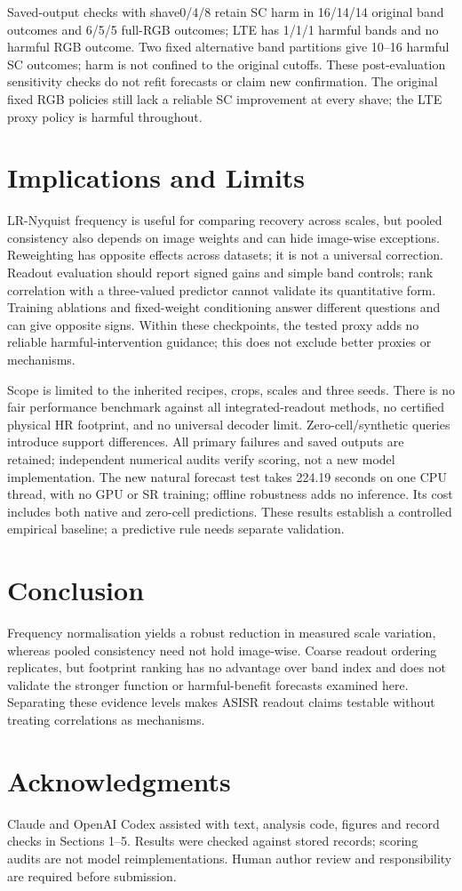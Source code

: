 Saved-output checks with shave0/4/8 retain SC harm in 16/14/14 original
band outcomes and 6/5/5 full-RGB outcomes; LTE has 1/1/1 harmful bands
and no harmful RGB outcome. Two fixed alternative band partitions give
10--16 harmful SC outcomes; harm is not confined to the original cutoffs.
These post-evaluation sensitivity checks do not refit forecasts or claim
new confirmation. The original fixed RGB policies still lack a reliable
SC improvement at every shave; the LTE proxy policy is harmful throughout.

\section{Implications and Limits}
LR-Nyquist frequency is useful for comparing recovery across scales,
but pooled consistency also depends on image weights and can hide
image-wise exceptions. Reweighting has opposite effects across datasets;
it is not a universal correction. Readout evaluation should report signed gains and
simple band controls; rank correlation with a three-valued predictor
cannot validate its quantitative form. Training ablations and
fixed-weight conditioning answer different questions and can give
opposite signs. Within these checkpoints, the tested proxy adds no
reliable harmful-intervention guidance; this does not exclude better
proxies or mechanisms.

\newpage
Scope is limited to the inherited recipes, crops, scales and three seeds.
There is no fair performance benchmark against all integrated-readout
methods, no certified physical HR footprint, and no universal decoder
limit. Zero-cell/synthetic queries introduce support differences. All
primary failures and saved outputs are retained; independent numerical
audits verify scoring, not a new model implementation. The new natural
forecast test takes 224.19 seconds on one CPU thread, with no GPU or SR
training; offline robustness adds no inference. Its cost includes both
native and zero-cell predictions. These results establish a controlled
empirical baseline; a predictive rule needs separate validation.

\section{Conclusion}
Frequency normalisation yields a robust reduction in measured scale
variation, whereas pooled consistency need not hold image-wise. Coarse
readout ordering replicates, but footprint ranking has no advantage
over band index and does not validate
the stronger function or harmful-benefit forecasts examined here.
Separating these evidence levels makes ASISR readout claims testable
without treating correlations as mechanisms.

\section{Acknowledgments}
Claude and OpenAI Codex assisted with text, analysis code, figures and
record checks in Sections 1--5. Results were checked against stored
records; scoring audits are not model reimplementations. Human author
review and responsibility are required before submission.
